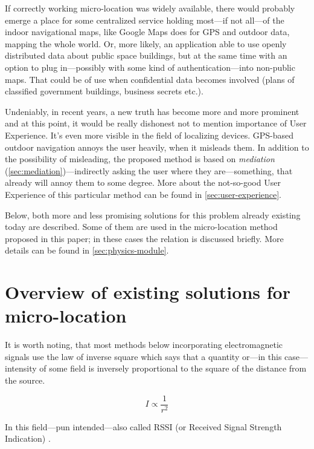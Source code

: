 If correctly working micro-location was widely available, there would probably emerge a place for some centralized service holding most---if not all---of the indoor navigational maps, like Google Maps does for GPS and outdoor data, mapping the whole world. Or, more likely, an application able to use openly distributed data about public space buildings, but at the same time with an option to plug in---possibly with some kind of authentication---into non-public maps. That could be of use when confidential data becomes involved (plans of classified government buildings, business secrets etc.).

Undeniably, in recent years, a new truth has become more and more prominent and at this point, it would be really dishonest not to mention importance of User Experience. It's even more visible in the field of localizing devices. GPS-based outdoor navigation annoys the user heavily, when it misleads them. In addition to the possibility of misleading, the proposed method is based on \emph{mediation} (\cref{sec:mediation})---indirectly asking the user where they are---something, that already will annoy them to some degree. More about the not-so-good User Experience of this particular method can be found in \cref{sec:user-experience}.

Below, both more and less promising solutions for this problem already existing today are described. Some of them are used in the micro-location method proposed in this paper; in these cases the relation is discussed briefly. More details can be found in \cref{sec:physics-module}.

\section{Overview of existing solutions for micro-location}
\label{sec:existing-uloc}

It is worth noting, that most methods below incorporating electromagnetic signals use the law of inverse square which says that a quantity or---in this case---intensity of some field is inversely proportional to the square of the distance from the source.

\begin{equation}
	\label{eq:inverse-sq}
	I \propto \frac{1}{r^2}
\end{equation}

In this field---pun intended---also called RSSI (or Received Signal Strength Indication) \cite{Gough:RSSI}.

